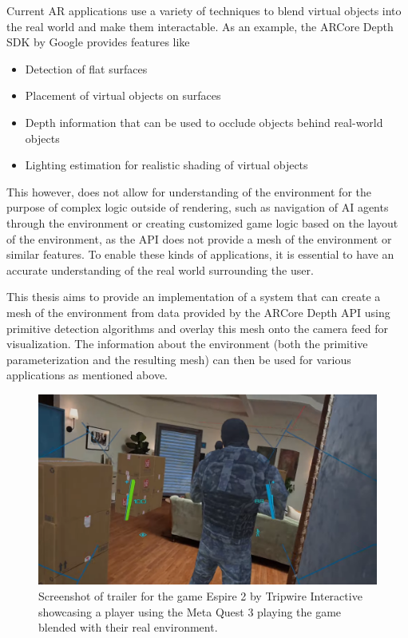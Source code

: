 %
Current AR applications use a variety of techniques to blend virtual objects into the real world and make them interactable.
As an example, the ARCore Depth SDK by Google provides features like
\begin{itemize}
    \item Detection of flat surfaces
    \item Placement of virtual objects on surfaces
    \item Depth information that can be used to occlude objects behind real-world objects
    \item Lighting estimation for realistic shading of virtual objects
\end{itemize}
This however, does not allow for understanding of the environment for the purpose of complex logic outside of rendering,
such as navigation of AI agents through the environment or creating customized game logic based on the layout of the environment,
as the API does not provide a mesh of the environment or similar features.
To enable these kinds of applications, it is essential to have an accurate understanding of the real world surrounding the user.

This thesis aims to provide an implementation of a system that can create a mesh of the environment
from data provided by the ARCore Depth API using primitive detection algorithms and overlay this mesh onto the camera feed for visualization.
The information about the environment (both the primitive parameterization and the resulting mesh) can then be used for various applications as mentioned above.
\begin{figure}[h]
    \centering
    \includegraphics[width=0.8\linewidth]{images/Tripwire Interactive - Espire 2 Mixed Reality Update Trailer [50DD3XwjOIA - 2001x1126 - 0m21s]}
    \caption{Screenshot of trailer for the game Espire 2 by Tripwire Interactive showcasing a player using the Meta Quest 3 playing the game blended with their real environment.}
    \label{fig:quest3-example}
\end{figure}


